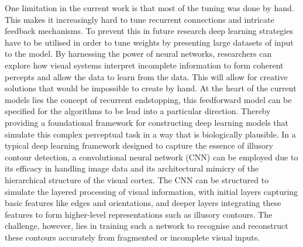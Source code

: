 \documentclass[12pt]{article}
\begin{document}
One limitation in the current work is that most of the tuning was done by hand. This makes it increasingly hard to tune recurrent connections and intricate feedback mechanisms. To prevent this in future research deep learning strategies have to be utilised in order to tune weights by presenting large datasets of input to the model. By harnessing the power of neural networks, researchers can explore how visual systems interpret incomplete information to form coherent percepts and allow the data to learn from the data. This will allow for creative solutions that would be impossible to create by hand. At the heart of the current models lies the concept of recurrent endstopping, this feedforward model can be specified for the algorithms to be lead into a particular direction. Thereby providing a foundational framework for constructing deep learning models that simulate this complex perceptual task in a way that is biologically plausible.
\bigbreak
In a typical deep learning framework designed to capture the essence of illusory contour detection, a convolutional neural network (CNN) can be employed due to its efficacy in handling image data and its architectural mimicry of the hierarchical structure of the visual cortex. The CNN can be structured to simulate the layered processing of visual information, with initial layers capturing basic features like edges and orientations, and deeper layers integrating these features to form higher-level representations such as illusory contours. The challenge, however, lies in training such a network to recognise and reconstruct these contours accurately from fragmented or incomplete visual inputs.
\end{document}
